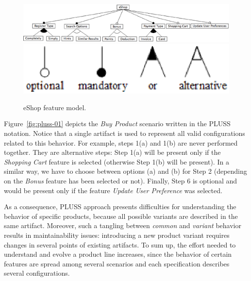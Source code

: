 \documentclass{acm_proc_article-sp}
\begin{document}
 \begin{figure}[th]
 \begin{center}
  \includegraphics[scale=0.25]{img/eShop-fm3.eps}
   \includegraphics[scale=0.30]{img/fm-notation.eps}
  \caption{eShop feature model.}
  \label{fig:eshop-fm}
  \end{center}
\end{figure}




Figure~\ref{fig:pluss-01} depicts the \emph{Buy Product} scenario written in the
PLUSS notation. Notice that a single artifact is used to represent all valid
configurations related to this behavior. For example, steps 1(a) and 1(b) are
never performed together. They are alternative steps: Step 1(a) will be present only if
the \emph{Shopping Cart} feature is selected (otherwise Step 1(b) will be
present). In a similar way, we have to choose between options (a) and (b) for
Step 2 (depending on the \emph{Bonus} feature has been selected or not). Finally,
Step 6 is optional and would be present only if the feature \emph{Update User
Preference} was selected. 

As a consequence, PLUSS approach presents difficulties for understanding the
behavior of specific products, because all possible variants are described in the
same artifact. Moreover, such a tangling between \emph{common} and
\emph{variant} behavior results in maintainability issues: introducing a new product variant
requires changes in several points of existing artifacts. To sum  up, the effort
needed to understand and evolve a product line increases, since the behavior of
certain features are spread among several scenarios and each specification
describes several configurations.
\end{document}
